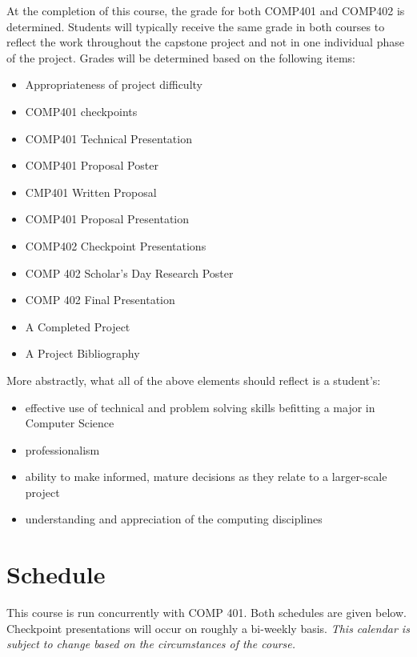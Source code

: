 \documentclass[nobib]{tufte-handout}
\begin{document}
At the completion of this course, the grade for both COMP401 and COMP402 is determined. Students will typically receive the same grade in both courses to reflect the work throughout the capstone project and not in one individual phase of the project. Grades will be determined based on the following items:
\begin{itemize}
\item Appropriateness of project difficulty
\item COMP401 checkpoints
\item COMP401 Technical Presentation
\item COMP401 Proposal Poster
\item CMP401 Written Proposal
\item COMP401 Proposal Presentation
\item COMP402 Checkpoint Presentations
\item COMP 402 Scholar's Day Research Poster
\item COMP 402 Final Presentation
\item A Completed Project
\item A Project Bibliography
\end{itemize}

More abstractly, what all of the above elements should reflect is a student's:
\begin{itemize}
\item effective use of technical and problem solving skills befitting a major in Computer Science
\item professionalism
\item ability to make informed, mature decisions as they relate to a larger-scale project
\item understanding and appreciation of the computing disciplines
\end{itemize}

\section{Schedule}

This course is run concurrently with COMP 401. Both schedules are given below. Checkpoint presentations will occur on roughly a bi-weekly basis.  \textit{This calendar is subject to change based on the circumstances of the course.}
\end{document}
